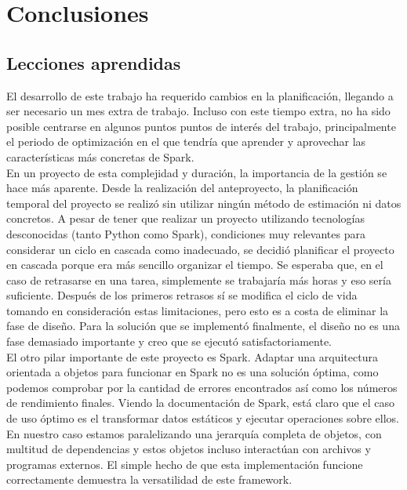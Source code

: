\chapter{Conclusiones}
\label{ch:conclusiones}


\section{Lecciones aprendidas}

El desarrollo de este trabajo ha requerido cambios en la planificación, llegando a ser necesario un mes extra de trabajo. Incluso con este tiempo extra, no ha sido posible centrarse en algunos puntos puntos de interés del trabajo, principalmente el periodo de optimización en el que tendría que aprender y aprovechar las características más concretas de Spark. \\

En un proyecto de esta complejidad y duración, la importancia de la gestión se hace más aparente. Desde la realización del anteproyecto, la planificación temporal del proyecto se realizó sin utilizar ningún método de estimación ni datos concretos. A pesar de tener que realizar un proyecto utilizando tecnologías desconocidas (tanto Python como Spark), condiciones muy relevantes para considerar un ciclo en cascada como inadecuado, se decidió planificar el proyecto en cascada porque era más sencillo organizar el tiempo. Se esperaba que, en el caso de retrasarse en una tarea, simplemente se trabajaría más horas y eso sería suficiente. Después de los primeros retrasos sí se modifica el ciclo de vida tomando en consideración estas limitaciones, pero esto es a costa de eliminar la fase de diseño. Para la solución que se implementó finalmente, el diseño no es una fase demasiado importante y creo que se ejecutó satisfactoriamente.\\

El otro pilar importante de este proyecto es Spark. Adaptar una arquitectura orientada a objetos para funcionar en Spark no es una solución óptima, como podemos comprobar por la cantidad de errores encontrados así como los números de rendimiento finales. Viendo la documentación de Spark, está claro que el caso de uso óptimo es el transformar datos estáticos y ejecutar operaciones sobre ellos. En nuestro caso estamos paralelizando una jerarquía completa de objetos, con multitud de dependencias y estos objetos incluso interactúan con archivos y programas externos. El simple hecho de que esta implementación funcione correctamente demuestra la versatilidad de este framework.\\

